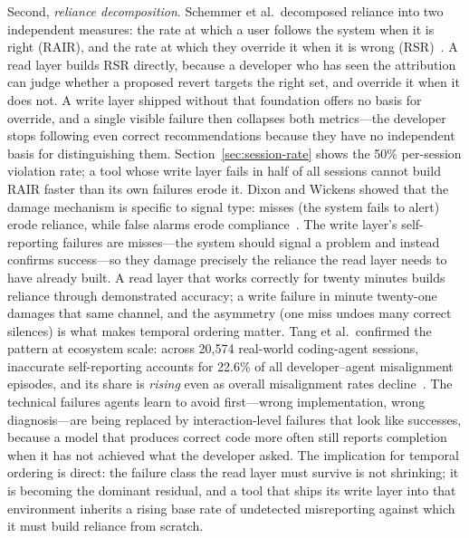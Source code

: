 Second, \emph{reliance decomposition}. Schemmer et al.\ decomposed reliance into
two independent measures: the rate at which a user follows the system when it is
right (RAIR), and the rate at which they override it when it is wrong
(RSR)~\cite{schemmer2022}. A read layer builds RSR directly, because a developer
who has seen the attribution can judge whether a proposed revert targets the
right set, and override it when it does not. A write layer shipped without that
foundation offers no basis for override, and a single visible failure then
collapses both metrics---the developer stops following even correct
recommendations because they have no independent basis for distinguishing them.
Section~\ref{sec:session-rate} shows the 50\% per-session violation rate; a tool
whose write layer fails in half of all sessions cannot build RAIR faster than
its own failures erode it. Dixon and Wickens showed that the damage mechanism
is specific to signal type: misses (the system fails to alert) erode reliance,
while false alarms erode compliance~\cite{dixon2007}. The write layer's
self-reporting failures are misses---the system should signal a problem and
instead confirms success---so they damage precisely the reliance the read layer
needs to have already built. A read layer that works correctly for twenty
minutes builds reliance through demonstrated accuracy; a write failure in minute
twenty-one damages that same channel, and the asymmetry (one miss undoes many
correct silences) is what makes temporal ordering matter.
Tang et al.\ confirmed the pattern at ecosystem scale: across 20{,}574
real-world coding-agent sessions, inaccurate self-reporting accounts for
22.6\% of all developer--agent misalignment episodes, and its share is
\emph{rising} even as overall misalignment rates
decline~\cite{tang2026agentfailures}. The technical failures agents learn to
avoid first---wrong implementation, wrong diagnosis---are being replaced by
interaction-level failures that look like successes, because a model that
produces correct code more often still reports completion when it has not
achieved what the developer asked. The implication for temporal ordering is
direct: the failure class the read layer must survive is not shrinking; it is
becoming the dominant residual, and a tool that ships its write layer into that
environment inherits a rising base rate of undetected misreporting against which
it must build reliance from scratch.

